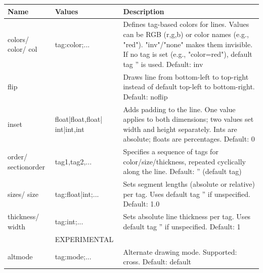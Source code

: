 \documentclass[a4paper,11pt]{article}
\begin{document}
\renewcommand{\arraystretch}{1.3}
\begin{tcolorbox}[colback=white, colframe=black!75, title=Arguments]
\begin{tabularx}{\linewidth}{p{45pt}|p{90pt}|X}
\textbf{Name} & \textbf{Values} & \textbf{Description}\\
\hline
colors/ color/ col & tag:color;... & Defines tag-based colors for lines. Values can be RGB (r,g,b) or color names (e.g., "red"). "inv"/"none" makes them invisible. If no tag is set (e.g., "color=red"), default tag '' is used. Default: inv\\
\rowcolor[HTML]{E8E8E8}
flip & & Draws line from bottom-left to top-right instead of default top-left to bottom-right. Default: noflip\\
inset & float|float,float| int|int,int & Adds padding to the line. One value applies to both dimensions; two values set width and height separately. Ints are absolute; floats are percentages. Default: 0\\
\rowcolor[HTML]{E8E8E8}
order/ sectionorder & tag1,tag2,... & Specifies a sequence of tags for color/size/thickness, repeated cyclically along the line. Default: '' (default tag)\\
sizes/ size & tag:float|int;... & Sets segment lengths (absolute or relative) per tag. Uses default tag '' if unspecified. Default: 1.0\\
\rowcolor[HTML]{E8E8E8}
thickness/ width & tag:int;... & Sets absolute line thickness per tag. Uses default tag '' if unspecified. Default: 1\\
& EXPERIMENTAL & \\
\rowcolor[HTML]{E8E8E8}
altmode & tag:mode;... & Alternate drawing mode. Supported: cross. Default: default
\end{tabularx}
\end{tcolorbox}
\end{document}

